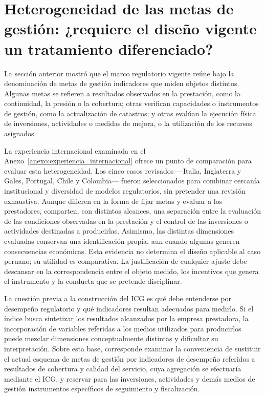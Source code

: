 \section{Heterogeneidad de las metas de gestión: ¿requiere el diseño vigente un tratamiento diferenciado?}

La sección anterior mostró que el marco regulatorio vigente reúne bajo la denominación de metas de gestión indicadores que miden objetos distintos. Algunas metas se refieren a resultados observados en la prestación, como la continuidad, la presión o la cobertura; otras verifican capacidades o instrumentos de gestión, como la actualización de catastros; y otras evalúan la ejecución física de inversiones, actividades o medidas de mejora, o la utilización de los recursos asignados.

La experiencia internacional examinada en el Anexo~\ref{anexo:experiencia_internacional} ofrece un punto de comparación para evaluar esta heterogeneidad. Los cinco casos revisados ---Italia, Inglaterra y Gales, Portugal, Chile y Colombia--- fueron seleccionados para combinar cercanía institucional y diversidad de modelos regulatorios, sin pretender una revisión exhaustiva. Aunque difieren en la forma de fijar metas y evaluar a los prestadores, comparten, con distintos alcances, una separación entre la evaluación de las condiciones observadas en la prestación y el control de las inversiones o actividades destinadas a producirlas. Asimismo, las distintas dimensiones evaluadas conservan una identificación propia, aun cuando algunas generen consecuencias económicas. Esta evidencia no determina el diseño aplicable al caso peruano; su utilidad es comparativa. La justificación de cualquier ajuste debe descansar en la correspondencia entre el objeto medido, los incentivos que genera el instrumento y la conducta que se pretende disciplinar.

La cuestión previa a la construcción del ICG es qué debe entenderse por desempeño regulatorio y qué indicadores resultan adecuados para medirlo. Si el índice busca sintetizar los resultados alcanzados por la empresa prestadora, la incorporación de variables referidas a los medios utilizados para producirlos puede mezclar dimensiones conceptualmente distintas y dificultar su interpretación. Sobre esta base, corresponde examinar la conveniencia de sustituir el actual esquema de metas de gestión por indicadores de desempeño referidos a resultados de cobertura y calidad del servicio, cuya agregación se efectuaría mediante el ICG, y reservar para las inversiones, actividades y demás medios de gestión instrumentos específicos de seguimiento y fiscalización.

